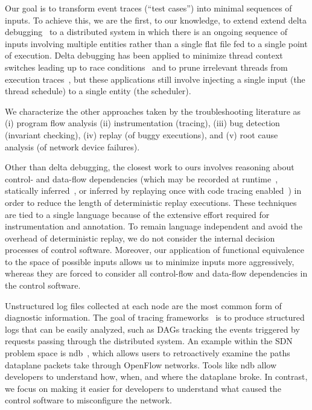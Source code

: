 Our goal is to transform
event traces (``test cases'') into minimal sequences of inputs.
To achieve this, we are the first, to our knowledge, to extend extend delta debugging~\cite{Zeller:1999:YMP:318773.318946,Zeller:2002:SIF:506201.506206}
to a distributed system in which there is an ongoing sequence of inputs
involving multiple entities rather than a single flat file fed to a single point of
execution. Delta debugging has been applied to minimize thread context switches
leading up to race conditions~\cite{choi2002isolating} and to
prune irrelevant threads from execution traces~\cite{huang2012lean}, but these
applications still involve injecting a single input (the thread schedule) to a single entity (the scheduler).

We characterize the other approaches taken by the troubleshooting literature
as (i) program flow analysis (ii) instrumentation (tracing),
(iii) bug detection (invariant checking),
(iv) replay (of buggy executions), and
(v) root cause analysis (of network device failures).

\vspace{0.05in}
 Other than delta debugging,
the closest work to ours involves reasoning about
control- and data-flow dependencies
(which may be recorded at runtime~\cite{Lee:2011:TGR:1993498.1993528},
statically inferred~\cite{huang2012lean}, or
inferred by replaying once with code tracing enabled~\cite{tallam2007enabling})
in order to reduce the length of deterministic replay executions. These
techniques are tied to a single language because of the extensive effort
required for instrumentation and annotation.  To remain language independent and avoid the
overhead of deterministic replay, we do not consider the internal
decision processes of control software. %
Moreover, our application of functional equivalence to the space of
possible inputs allows us to minimize
inputs more aggressively, whereas they are forced to consider all control-flow
and data-flow dependencies in the control software.

\vspace{0.05in}
 Unstructured
log files collected at each node are the most common form of diagnostic information. The goal of
tracing frameworks~\cite{pip,fonseca2007x,Chen02pinpoint:problem,ndb14,barham2004using}
is to produce structured logs that can be easily analyzed, such as DAGs tracking the events triggered by
requests passing through the distributed system. An example within the SDN
problem space is ndb~\cite{ndb14}, which
allows users to retroactively examine the paths dataplane packets
take through OpenFlow networks. Tools like ndb allow developers to understand
how, when, and where the dataplane broke. In contrast, we focus on making it
easier for developers to understand what caused the control software to
misconfigure the network. %

